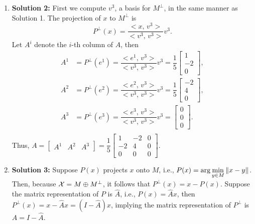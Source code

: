 \documentclass[letterpaper]{article}
\begin{document}
\begin{enumerate}
    \item[] \textbf{Solution 2:} First we compute $v^{3}$, a basis for $M^\perp$, in the same manner as Solution 1. The projection of $x$ to $M^\perp$ is
    \begin{equation*}
      P^\perp(x)=\dfrac{<x,\, v^{3}>}{<v^{3},\, v^{3}>}v^{3}.
    \end{equation*}
    Let $A^{i}$ denote the $i$-th column of $A$, then
    \begin{equation*}
      \begin{split}
        A^{1} & = P^\perp(e^{1})=\dfrac{<e^{1},\, v^{3}>}{<v^{3},\, v^{3}>}v^{3}=\dfrac{1}{5}\begin{bmatrix}1 \\ -2\\ 0 \end{bmatrix},\\
        A^{2} & = P^\perp(e^{2})=\dfrac{<e^{2},\, v^{3}>}{<v^{3},\, v^{3}>}v^{3}=\dfrac{1}{5}\begin{bmatrix} -2\\ 4 \\ 0 \end{bmatrix},\\
        A^{3} & = P^\perp(e^{3})=\dfrac{<e^{3},\, v^{3}>}{<v^{3},\, v^{3}>}v^{3}=\begin{bmatrix}0 \\ 0\\ 0 \end{bmatrix}.\\
      \end{split}
    \end{equation*}
    Thus,
    $A=\begin{bmatrix}A^{1} &A^{2} &A^{3} \end{bmatrix}=\dfrac{1}{5}\begin{bmatrix}1 &-2& 0\\ -2 & 4 & 0\\ 0 & 0 & 0\end{bmatrix}$.
    \newpage

    \item[] \textbf{Solution 3:} Suppose $P(x)$ projects $x$ onto $M$, i.e., $\displaystyle P(x)=\arg\min_{y\in M}\|x-y\|$. Then, because ${\cal X} = M \oplus M^\perp$, it follows that $P^\perp(x) = x-P(x)$. Suppose the matrix representation of $P$ is $\hat{A}$, i.e., $P(x)=\hat{A}x$, then $P^\perp(x)=x-\hat{A}x=(I-\hat{A})x$, implying the matrix representation of $P^\perp$ is $A=I-\hat{A}$.


\end{enumerate}
\end{document}
